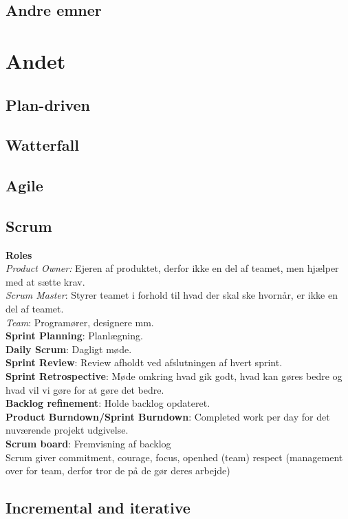 \documentclass[11pt,a4paper]{article}
\begin{document}
\subsection{Andre emner}
\newpage
\section{Andet}
\subsection{Plan-driven}
\subsection{Watterfall}
\subsection{Agile}
\subsection{Scrum}
\textbf{Roles}\\
\textit{Product Owner:} Ejeren af produktet, derfor ikke en del af teamet, men hjælper med at sætte krav.\\
\textit{Scrum Master}: Styrer teamet i forhold til hvad der skal ske hvornår,
er ikke en del af teamet.\\
\textit{Team}: Programører, designere mm.\\
\textbf{Sprint Planning}: Planlægning.\\
\textbf{Daily Scrum}: Dagligt møde.\\
\textbf{Sprint Review}: Review afholdt ved afslutningen af hvert sprint.\\
\textbf{Sprint Retrospective}: Møde omkring hvad gik godt, hvad kan gøres
bedre og hvad vil vi gøre for at gøre det bedre.\\
\textbf{Backlog refinement}: Holde backlog opdateret.\\
\textbf{Product Burndown/Sprint Burndown}: Completed work per day for det nuværende projekt udgivelse.\\
\textbf{Scrum board}: Fremvisning af backlog\\
Scrum giver commitment, courage, focus, openhed (team) respect
(management over for team, derfor tror de på de gør deres arbejde)
\subsection{Incremental and iterative}
\end{document}
